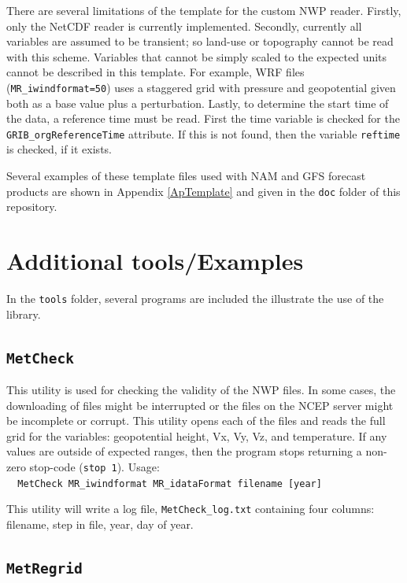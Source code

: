 \documentclass[11pt]{article}   %
\begin{document}
There are several limitations of the template for the custom NWP reader.  Firstly, only
the NetCDF reader is currently implemented.  Secondly, currently all variables are
assumed to be transient; so land-use or topography cannot be read with this scheme.
Variables that cannot be simply scaled to the expected units cannot be 
described in this template.  For example, WRF files (\verb|MR_iwindformat=50|) uses a staggered
grid with pressure and geopotential given both as a base value plus a perturbation.
Lastly, to determine the start time of the data, a reference time must be read.  First
the time variable is checked for the \texttt{GRIB\_orgReferenceTime} attribute.  If this
is not found, then the variable \texttt{reftime} is checked, if it exists.

Several examples of these template files used with NAM and GFS
forecast products are shown in Appendix \ref{ApTemplate} and given in the \texttt{doc} folder
of this repository.

\section{Additional tools/Examples}\label{SecTools}
In the \texttt{tools} folder, several programs are included the illustrate the
use of the library.

\subsection{\texttt{MetCheck}}

This utility is used for checking the validity of the NWP files.  In some
cases, the downloading of files might be interrupted or the files on the
NCEP server might be incomplete or corrupt.  This utility opens each of the files
and reads the full grid for the variables: geopotential height, Vx, Vy, Vz, and
temperature.  If any values are outside of expected ranges, then the program
stops returning a non-zero stop-code (\verb|stop 1|).
Usage:\\
\verb|  MetCheck MR_iwindformat MR_idataFormat filename [year]|

This utility will write a log file, \texttt{MetCheck\_log.txt} containing four columns:
filename, step in file, year, day of year.

\subsection{\texttt{MetRegrid}}
\end{document}
